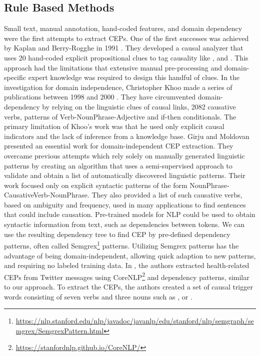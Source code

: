 \subsection{Rule Based Methods}\label{subsec:static-pattern-finding}
Small text, manual annotation, hand-coded features, and domain dependency were the first attempts to extract \ac{CEP}s.
One of the first successes was achieved by Kaplan and Berry-Rogghe in 1991 \cite{kaplan1991knowledge}.
They developed a causal analyzer that uses 20 hand-coded explicit propositional clues to tag causality like ,  and .
This approach had the limitations that extensive manual pre-processing and domain-specific expert knowledge was required to design this handful of clues.
In the investigation for domain independence, Christopher Khoo made a series of publications between 1998 and 2000 \cite{khoo1998automatic, khoo1999method, khoo2000extracting}.
They have circumvented domain-dependency by relying on the linguistic clues of causal links, 2082 causative verbs, patterns of Verb-NounPhrase-Adjective and if-then conditionals.
The primary limitation of Khoo's work was that he used only explicit causal indicators and the lack of inference from a knowledge base.
Girju and Moldovan \cite{girju2002text} presented an essential work for domain-independent CEP extraction.
They overcame previous attempts which rely solely on manually generated linguistic patterns by creating an algorithm that uses a semi-supervised approach to validate and obtain a list of automatically discovered linguistic patterns.
Their work focused only on explicit syntactic patterns of the form NounPhrase-CausativeVerb-NounPhrase.
They also provided a list of such causative verbs, based on ambiguity and frequency, used in many applications to find sentences that could include causation.
Pre-trained models for \ac{NLP} could be used to obtain syntactic information from text, such as dependencies between tokens.
We can use the resulting dependency tree to find \ac{CEP} by pre-defined dependency patterns, often called Semgrex\footnote{\url{https://nlp.stanford.edu/nlp/javadoc/javanlp/edu/stanford/nlp/semgraph/semgrex/SemgrexPattern.html}} patterns.
Utilizing Semgrex patterns has the advantage of being domain-independent, allowing quick adaption to new patterns, and requiring no labeled training data.
In \cite{doan2019extracting}, the authors extracted health-related \ac{CEP}s from Twitter messages using CoreNLP\footnote{\url{https://stanfordnlp.github.io/CoreNLP/}} and dependency patterns, similar to our approach.
To extract the \ac{CEP}s, the authors created a set of causal trigger words consisting of seven verbs and three nouns such as ,  or .
